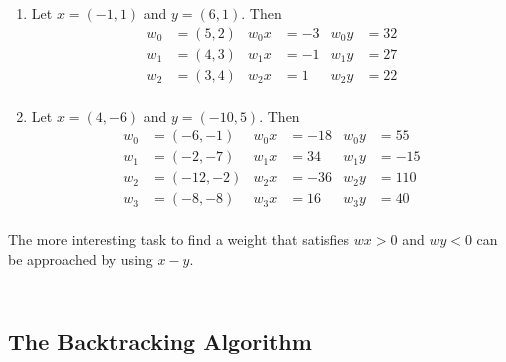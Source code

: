 \begin{examples}
    \hfill
    \begin{enumerate}
        \item Let \( x = (-1, 1) \) and \( y = (6, 1) \). Then
              \[
                  \begin{aligned}
                      w_0 & = (5, 2) & w_0x & = -3 & w_0y & = 32 \\
                      w_1 & = (4, 3) & w_1x & = -1 & w_1y & = 27 \\
                      w_2 & = (3, 4) & w_2x & = 1  & w_2y & = 22 \\
                  \end{aligned}
              \]
        \item Let \( x = (4, -6) \) and \( y = (-10, 5) \). Then
              \[
                  \begin{aligned}
                      w_0 & = (-6, -1)  & w_0x & = -18 & w_0y & = 55  \\
                      w_1 & = (-2, -7)  & w_1x & = 34  & w_1y & = -15 \\
                      w_2 & = (-12, -2) & w_2x & = -36 & w_2y & = 110 \\
                      w_3 & = (-8, -8)  & w_3x & = 16  & w_3y & = 40  \\
                  \end{aligned}
              \]
    \end{enumerate}
\end{examples}
\bigskip

The more interesting task to find a weight that satisfies \( wx > 0 \) and \( wy < 0 \) can be approached by
using \( x - y \).

\begin{algorithm}[Weight]\label{algo:weight}
\end{algorithm}
\inputminted[fontsize=\small, framesep=0.35cm, frame=lines, python3=true]{python}{python/weight.py}
\bigskip


\begin{algorithm}[Perceptron]\label{algo:perceptron}
\end{algorithm}
\inputminted[fontsize=\small, framesep=0.35cm, frame=lines, python3=true]{python}{python/perceptron.py}
\bigskip


\subsection{The Backtracking Algorithm}

